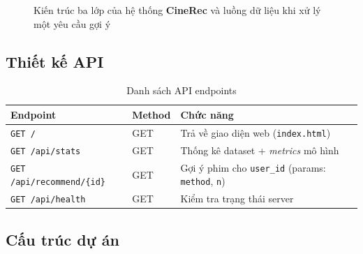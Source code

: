﻿\documentclass[../BTL.tex]{subfiles}
\begin{document}
\begin{figure}[H]
{
}%
\caption{Kiến trúc ba lớp của hệ thống \textbf{CineRec} và luồng dữ liệu khi
xử lý một yêu cầu gợi ý}
\label{fig:architecture}
\end{figure}

\subsection{Thiết kế API}
\label{section:3.3.2}

\begin{table}[H]
    \centering
    \caption{Danh sách API endpoints}
    \label{tab:api}
    \begin{tabular}{llp{7cm}}
        \toprule
        \textbf{Endpoint} & \textbf{Method} & \textbf{Chức năng} \\
        \midrule
        \texttt{GET /}
            & GET & Trả về giao diện web (\texttt{index.html}) \\
        \texttt{GET /api/stats}
            & GET & Thống kê dataset + \textit{metrics} mô hình \\
        \texttt{GET /api/recommend/\{id\}}
            & GET & Gợi ý phim cho \texttt{user\_id}
                    (params: \texttt{method}, \texttt{n}) \\
        \texttt{GET /api/health}
            & GET & Kiểm tra trạng thái server \\
        \bottomrule
    \end{tabular}
\end{table}

\subsection{Cấu trúc dự án}
\label{section:3.3.3}
\end{document}
